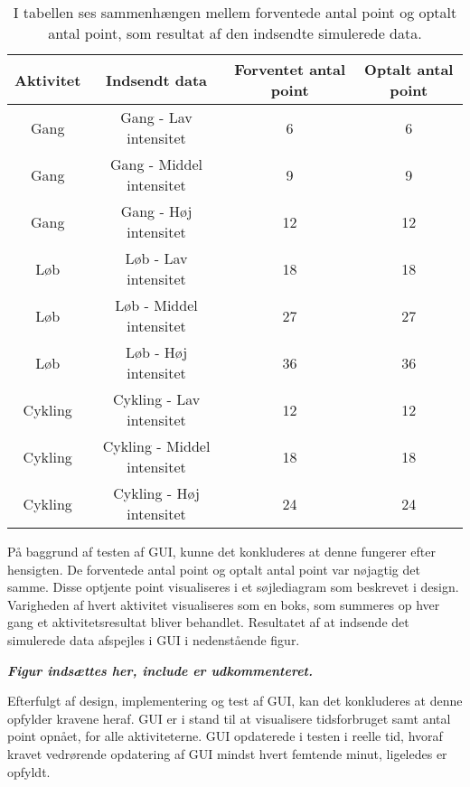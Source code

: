 \begin{table}[H]
	\centering
	\begin{tabular}{cccc}
		\hline
		\rowcolor[HTML]{C0C0C0} 
		Aktivitet & Indsendt data & Forventet antal point & Optalt antal point \\ \hline
		Gang & Gang - Lav intensitet & 6 & 6 \\ \hline
		Gang & Gang - Middel intensitet & 9 & 9 \\ \hline
		Gang & Gang - Høj intensitet & 12 & 12 \\ \hline
		Løb & Løb - Lav intensitet & 18 & 18 \\ \hline
		Løb & Løb - Middel intensitet & 27 & 27 \\ \hline
		Løb & Løb - Høj intensitet & 36 & 36 \\ \hline
		Cykling & Cykling - Lav intensitet & 12 & 12 \\ \hline
		Cykling & Cykling - Middel intensitet & 18 & 18 \\ \hline
		Cykling & Cykling - Høj intensitet & 24 & 24 \\ \hline
	\end{tabular}
	\caption{I tabellen ses sammenhængen mellem forventede antal point og optalt antal point, som resultat af den indsendte simulerede data.}
	\label{test:GUI}
\end{table}\vspace{-.5cm}
På baggrund af testen af GUI, kunne det konkluderes at denne fungerer efter hensigten. De forventede antal point og optalt antal point var nøjagtig det samme. Disse optjente point visualiseres i et søjlediagram som beskrevet i design. Varigheden af hvert aktivitet visualiseres som en boks, som summeres op hver gang et aktivitetsresultat bliver behandlet. Resultatet af at indsende det simulerede data afspejles i GUI i nedenstående figur.

\textit{\textbf{Figur indsættes her, include er udkommenteret.} }

Efterfulgt af design, implementering og test af GUI, kan det konkluderes at denne opfylder kravene heraf. GUI er i stand til at visualisere tidsforbruget samt antal point opnået, for alle aktiviteterne. GUI opdaterede i testen i reelle tid, hvoraf kravet vedrørende opdatering af GUI mindst hvert femtende minut, ligeledes er opfyldt.